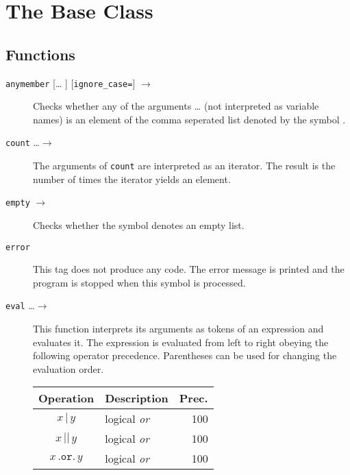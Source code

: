 \documentclass[11pt,a4paper]{refrep}
\begin{document}
\section{The Base Class}
\subsection{Functions}
\begin{description}
\item[\texttt{anymember}
    {[\dots
   ]}  {[\texttt{ignore\_case=}]} 
   $\to$ ]
   Checks whether any of the arguments  \ldots
    (not interpreted as variable names) is an element of
   the comma seperated list denoted by the symbol .
\item[\texttt{count} \ldots $\to$ ] The arguments of
   \texttt{count} are interpreted as an iterator. The result is the
   number of times the iterator yields an element.
\item[\texttt{empty}  $\to$ ]
   Checks whether the symbol  denotes an empty list.
\item[\texttt{error} ] This tag does not produce any code.
   The error message is printed and the program is stopped when this
   symbol is processed.
\item[\texttt{eval} \ldots $\to$ ]
   This function interprets its arguments as tokens of an expression and
   evaluates it. The expression is evaluated from left to right obeying
   the following operator precedence. Parentheses can be used for changing
   the evaluation order.
   \begin{center}
   \begin{longtable}{|c|p{12em}|r|}
   \hline
   {\bf Operation}&
   {\bf Description}&
   {\bf Prec.}\\
   \hline
\endhead
   \hline
\endlastfoot
   $x\,\mathtt{|}\,y$ & logical \emph{or} & 100\\
   $x\,\mathtt{||}\,y$ & logical \emph{or} & 100\\
   $x\,\mathtt{.or.}\,y$ & logical \emph{or} & 100\\

\end{longtable}
\end{center}
\end{description}
\end{document}
